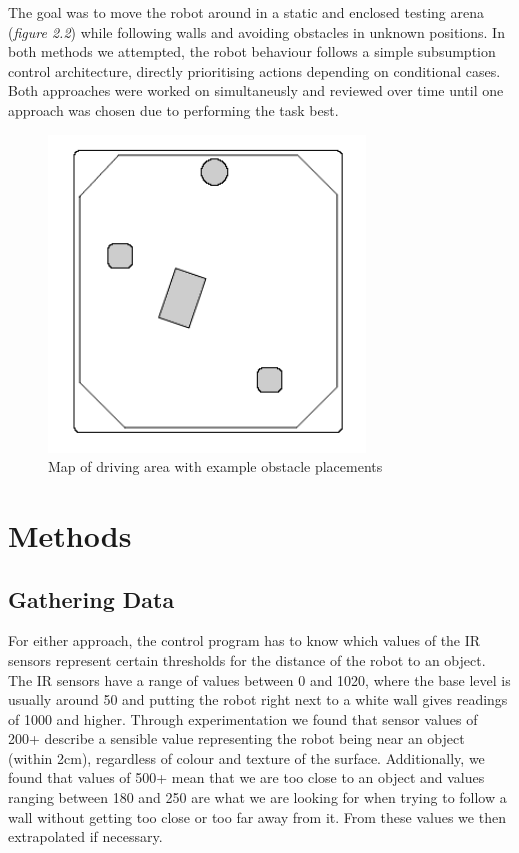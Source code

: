 \documentclass[paper=a4, fontsize=12pt]{scrartcl}	%
\numberwithin{equation}{section}		%
\numberwithin{figure}{section}			%
\numberwithin{table}{section}				%
\begin{document}
The goal was to move the robot around in a static and enclosed testing arena (\emph{figure 2.2}) while following walls and avoiding obstacles in unknown positions. In both methods we attempted, the robot behaviour follows a simple subsumption control architecture, directly prioritising actions depending on conditional cases. Both approaches were worked on simultaneusly and reviewed over time until one approach was chosen due to performing the task best.
\begin{figure}[!ht]
 \centering
  \includegraphics[width=0.75\textwidth]{mapexample}
  \caption{Map of driving area with example obstacle placements}
\end{figure}

\section{Methods}
\subsection{Gathering Data}
For either approach, the control program has to know which values of the IR sensors represent certain thresholds for the distance of the robot to an object. The IR sensors have a range of values between 0 and 1020, where the base level is usually around 50 and putting the robot right next to a white wall gives readings of 1000 and higher. Through experimentation we found that sensor values of 200+ describe a sensible value representing the robot being near an object (within 2cm), regardless of colour and texture of the surface. Additionally, we found that values of 500+ mean that we are too close to an object and values ranging between 180 and 250 are what we are looking for when trying to follow a wall without getting too close or too far away from it. From these values we then extrapolated if necessary.
\end{document}
